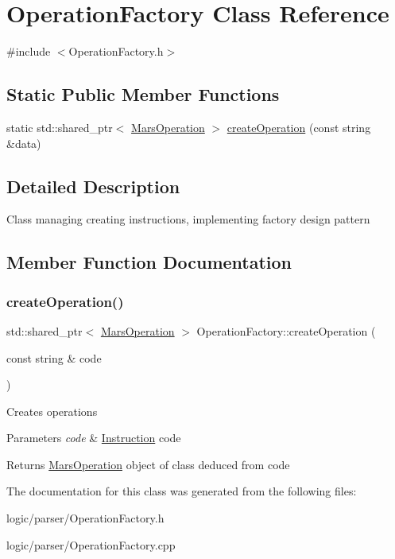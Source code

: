 \hypertarget{classOperationFactory}{}\section{Operation\+Factory Class Reference}
\label{classOperationFactory}


{\ttfamily \#include $<$Operation\+Factory.\+h$>$}

\subsection*{Static Public Member Functions}
\begin{DoxyCompactItemize}
\item 
static std\+::shared\+\_\+ptr$<$ \hyperlink{classMarsOperation}{Mars\+Operation} $>$ \hyperlink{classOperationFactory_a97194e25673cefb82196d74091b1d2bf}{create\+Operation} (const string \&data)
\end{DoxyCompactItemize}


\subsection{Detailed Description}
Class managing creating instructions, implementing factory design pattern 

\subsection{Member Function Documentation}
\mbox{\label{classOperationFactory_a97194e25673cefb82196d74091b1d2bf}} 
\subsubsection{\texorpdfstring{create\+Operation()}{createOperation()}}
{\footnotesize\ttfamily std\+::shared\+\_\+ptr$<$ \hyperlink{classMarsOperation}{Mars\+Operation} $>$ Operation\+Factory\+::create\+Operation (\begin{DoxyParamCaption}\item[{const string \&}]{code }\end{DoxyParamCaption})\hspace{0.3cm}{\ttfamily [static]}}

Creates operations 
\begin{DoxyParams}{Parameters}
{\em code} & \hyperlink{classInstruction}{Instruction} code \\
\hline
\end{DoxyParams}
\begin{DoxyReturn}{Returns}
\hyperlink{classMarsOperation}{Mars\+Operation} object of class deduced from code 
\end{DoxyReturn}


The documentation for this class was generated from the following files\+:\begin{DoxyCompactItemize}
\item 
logic/parser/Operation\+Factory.\+h\item 
logic/parser/Operation\+Factory.\+cpp\end{DoxyCompactItemize}
